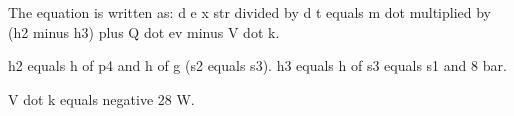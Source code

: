 The equation is written as:  
d e x str divided by d t equals m dot multiplied by (h2 minus h3) plus Q dot ev minus V dot k.  

h2 equals h of p4 and h of g (s2 equals s3).  
h3 equals h of s3 equals s1 and 8 bar.  

V dot k equals negative 28 W.